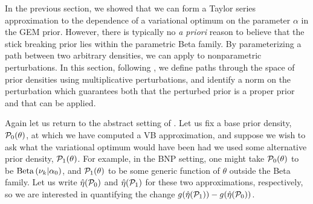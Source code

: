 In the previous section, we showed that we can form a Taylor series
approximation to the dependence of a variational optimum on the parameter
$\alpha$ in the GEM prior.  However, there is typically no {\em a priori} reason
to believe that the stick breaking prior lies within the parametric Beta family.
By parameterizing a path between two arbitrary densities, we can apply
 to nonparametric perturbations. In this section, following
\citet{gustafson:1996:local}, we define paths through the space of prior
densities using multiplicative perturbations, and identify a norm on the
perturbation which guarantees both that the perturbed prior is a proper prior
and that  can be applied.


Again let us return to the abstract setting of . Let us fix a
base prior density, $\mathcal{P}_{0}(\theta)$, at which we have computed a VB
approximation, and suppose we wish to ask what the variational optimum would
have been had we used some alternative prior density, $\mathcal{P}_{1}(\theta)$. For
example, in the BNP setting, one might take $\mathcal{P}_{0}(\theta)$ to be
$\mathrm{Beta}\left(\nu_{k} \vert \alpha_0\right)$, and $\mathcal{P}_{1}(\theta)$ to be some generic
function of $\theta$ outside the Beta family. Let us write $\hat\eta(\mathcal{P}_{0})$ and
$\hat\eta(\mathcal{P}_{1})$ for these two approximations, respectively, so we are
interested in quantifying the change $g(\hat\eta(\mathcal{P}_{1})) - g(\hat\eta(\mathcal{P}_{0}))$.

